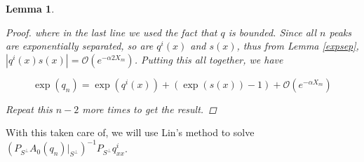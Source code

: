 \documentclass[12pt]{article}
\newtheorem{lemma}{Lemma}
\begin{document}
\begin{lemma}
\begin{proof}
where in the last line we used the fact that $q$ is bounded. Since all $n$ peaks are exponentially separated, so are $q^i(x)$ and $s(x)$, thus from Lemma \ref{expsep}, $\left| q^i(x)s(x) \right| = \mathcal{O}(e^{-\alpha 2 X_m})$. Putting this all together, we have

\begin{equation}
\exp(q_n) = \exp( q^i(x)) + (\exp(s(x)) - 1) + \mathcal{O}(e^{-\alpha X_m}) 
\end{equation}

Repeat this $n - 2$ more times to get the result.

\end{proof}
\end{lemma}

With this taken care of, we will use Lin's method to solve $(P_{S^\perp} A_0(q_n) |_{S^\perp})^{-1} P_{S^\perp} q^i_{xx}$.

\end{document}
